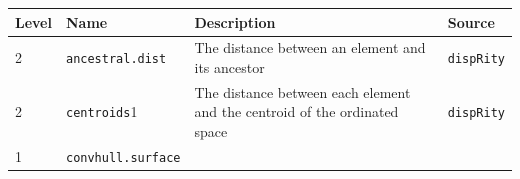 \documentclass[]{book}
\theoremstyle{definition}
\theoremstyle{definition}
\theoremstyle{remark}
\begin{document}
\begin{longtable}[]{@{}llll@{}}
\toprule
\begin{minipage}[b]{0.08\columnwidth}\raggedright\strut
Level\strut
\end{minipage} & \begin{minipage}[b]{0.08\columnwidth}\raggedright\strut
Name\strut
\end{minipage} & \begin{minipage}[b]{0.61\columnwidth}\raggedright\strut
Description\strut
\end{minipage} & \begin{minipage}[b]{0.11\columnwidth}\raggedright\strut
Source\strut
\end{minipage}\tabularnewline
\midrule
\endhead
\begin{minipage}[t]{0.08\columnwidth}\raggedright\strut
2\strut
\end{minipage} & \begin{minipage}[t]{0.08\columnwidth}\raggedright\strut
\texttt{ancestral.dist}\strut
\end{minipage} & \begin{minipage}[t]{0.61\columnwidth}\raggedright\strut
The distance between an element and its ancestor\strut
\end{minipage} & \begin{minipage}[t]{0.11\columnwidth}\raggedright\strut
\texttt{dispRity}\strut
\end{minipage}\tabularnewline
\begin{minipage}[t]{0.08\columnwidth}\raggedright\strut
2\strut
\end{minipage} & \begin{minipage}[t]{0.08\columnwidth}\raggedright\strut
\texttt{centroids}1\strut
\end{minipage} & \begin{minipage}[t]{0.61\columnwidth}\raggedright\strut
The distance between each element and the centroid of the ordinated
space\strut
\end{minipage} & \begin{minipage}[t]{0.11\columnwidth}\raggedright\strut
\texttt{dispRity}\strut
\end{minipage}\tabularnewline
\begin{minipage}[t]{0.08\columnwidth}\raggedright\strut
1\strut
\end{minipage} & \begin{minipage}[t]{0.08\columnwidth}\raggedright\strut
\texttt{convhull.surface}\strut
\end{minipage} & \begin{minipage}[t]{0.61\columnwidth}\raggedright\strut

\end{minipage}
\end{longtable}
\end{document}
